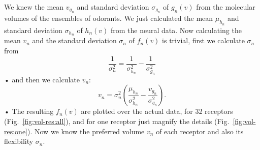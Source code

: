 \documentclass[11pt]{paper} %
\newcommand{\numberofreceptors}{32 }
\begin{document}
We knew the mean $v_{g_n}$ and standard deviation $\sigma_{g_n}$ of $g_n(v)$ from the molecular volumes of the ensembles of odorants. 
We just calculated the mean $\mu_{h_n}$ and standard deviation $\sigma_{h_n}$ of $h_n(v)$ from the neural data.
Now calculating the mean $v_n$ and the standard deviation $\sigma_n$ of $f_n(v)$ is trivial,
first we calculate $\sigma_n$ from 
\begin{equation}
	\frac{1}{\sigma_n^2} = \frac{1}{\sigma^2_{h_n}}  - \frac{1}{\sigma^2_{g_n}}
\end{equation}•
and then we calculate $v_n$: 
\begin{equation}
	v_n =  \sigma_n^2 \left ( \frac{\mu_{h_n}}{\sigma^2_{h_n}} - \frac{v_{g_n}}{\sigma^2_{g_n}} \right ).
\end{equation}•
The resulting $f_n(v)$ are plotted over the actual data, for \numberofreceptors receptors (Fig.~\ref{fig:vol-res:all}), 
and for one receptor just magnify the details (Fig.~\ref{fig:vol-res:one}).
Now we know the preferred volume $v_n$ of each receptor and also its flexibility $\sigma_n$.
\end{document}
